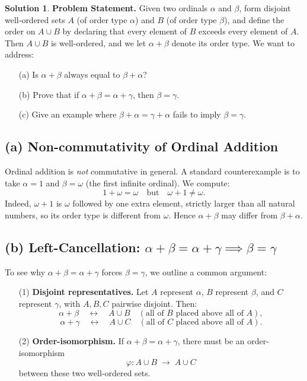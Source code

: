 \documentclass[12pt]{article}
\theoremstyle{definition} %
\newtheorem{solution}{Solution}
\theoremstyle{plain} %
\begin{document}
\begin{solution}

    \noindent \textbf{Problem Statement.} 
    Given two ordinals $\alpha$ and $\beta$, form disjoint well-ordered sets 
    $A$ (of order type $\alpha$) and $B$ (of order type $\beta$), 
    and define the order on $A \cup B$ by declaring that 
    every element of $B$ exceeds every element of $A$. 
    Then $A \cup B$ is well-ordered, and we let $\alpha + \beta$ 
    denote its order type. We want to address:
    
    \begin{enumerate}
    \item[(a)] Is $\alpha + \beta$ always equal to $\beta + \alpha$?
    \item[(b)] Prove that if $\alpha + \beta = \alpha + \gamma$, then $\beta = \gamma$.
    \item[(c)] Give an example where $\beta + \alpha = \gamma + \alpha$ fails to imply $\beta = \gamma$.
    \end{enumerate}
    
    \subsection*{(a) Non-commutativity of Ordinal Addition}
    
    Ordinal addition is \emph{not} commutative in general.  
    A standard counterexample is to take $\alpha = 1$ and $\beta = \omega$ 
    (the first infinite ordinal).  We compute:
    \[
    1 + \omega = \omega \quad \text{but} \quad \omega + 1 \neq \omega.
    \]
    Indeed, $\omega + 1$ is $\omega$ followed by one extra element, strictly larger 
    than all natural numbers, so its order type is different from $\omega$. 
    Hence $\alpha + \beta$ may differ from $\beta + \alpha$.
    
    \subsection*{(b) Left-Cancellation: 
    \texorpdfstring{$\alpha + \beta = \alpha + \gamma \implies \beta = \gamma$}{Left-Cancellation}}
    
    To see why $\alpha + \beta = \alpha + \gamma$ forces $\beta = \gamma$, 
    we outline a common argument:
    
    \begin{enumerate}
    \item[(1)] \textbf{Disjoint representatives.}
    Let $A$ represent $\alpha$, $B$ represent $\beta$, and $C$ represent $\gamma$, 
    with $A, B, C$ pairwise disjoint. Then:
    \[
    \alpha + \beta \quad \leftrightarrow \quad A \cup B \quad (\text{all of }B\text{ placed above all of }A),
    \]
    \[
    \alpha + \gamma \quad \leftrightarrow \quad A \cup C \quad (\text{all of }C\text{ placed above all of }A).
    \]
    \item[(2)] \textbf{Order-isomorphism.}
    If $\alpha + \beta = \alpha + \gamma$, there must be an 
    order-isomorphism 
    \[
    \varphi\colon A \cup B \;\longrightarrow\; A \cup C
    \]
    between these two well-ordered sets.
    

\end{enumerate}
\end{solution}
\end{document}
